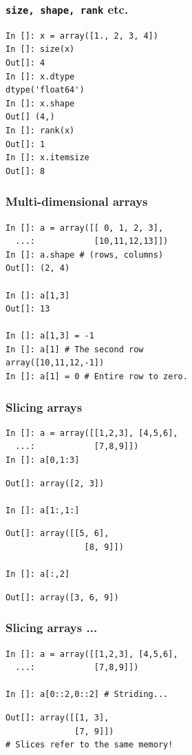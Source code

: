 \documentclass[14pt,compress]{beamer}
\newcounter{time}
\newcommand{\inctime}[1]{\addtocounter{time}{#1}{\tiny \thetime\ m}}
\newcommand{\typ}[1]{\lstinline{#1}}
\begin{document}
\begin{frame}[fragile]
    \frametitle{\typ{size, shape, rank} etc.}
\vspace*{-8pt}
\begin{lstlisting}
In []: x = array([1., 2, 3, 4])
In []: size(x)
Out[]: 4
In []: x.dtype
dtype('float64')
In []: x.shape
Out[] (4,)
In []: rank(x)
Out[]: 1
In []: x.itemsize
Out[]: 8
\end{lstlisting}
\end{frame}


\begin{frame}[fragile]
  \frametitle{Multi-dimensional arrays}
\begin{lstlisting}
In []: a = array([[ 0, 1, 2, 3],
  ...:            [10,11,12,13]])
In []: a.shape # (rows, columns)
Out[]: (2, 4)

In []: a[1,3]
Out[]: 13

In []: a[1,3] = -1
In []: a[1] # The second row
array([10,11,12,-1])
In []: a[1] = 0 # Entire row to zero.
\end{lstlisting}
\inctime{10}
\end{frame}

\begin{frame}
  \frametitle{Slicing arrays}
  \vspace*{-0.2in}
\begin{lstlisting}
In []: a = array([[1,2,3], [4,5,6],
  ...:            [7,8,9]])
In []: a[0,1:3]
\end{lstlisting}
  \pause
  \vspace*{-0.1in}
\begin{lstlisting}
Out[]: array([2, 3])

In []: a[1:,1:]
\end{lstlisting}
  \pause
  \vspace*{-0.1in}
\begin{lstlisting}
Out[]: array([[5, 6],
                [8, 9]])

In []: a[:,2]
\end{lstlisting}
  \pause
  \vspace*{-0.1in}
\begin{lstlisting}
Out[]: array([3, 6, 9])
\end{lstlisting}
\end{frame}

\begin{frame}
  \frametitle{Slicing arrays ...}
  \vspace*{-0.2in}
\begin{lstlisting}
In []: a = array([[1,2,3], [4,5,6],
  ...:            [7,8,9]])

In []: a[0::2,0::2] # Striding...
\end{lstlisting}
  \pause
  \vspace*{-0.1in}
\begin{lstlisting}
Out[]: array([[1, 3],
              [7, 9]])
# Slices refer to the same memory!
\end{lstlisting}
\end{frame}
\end{document}
